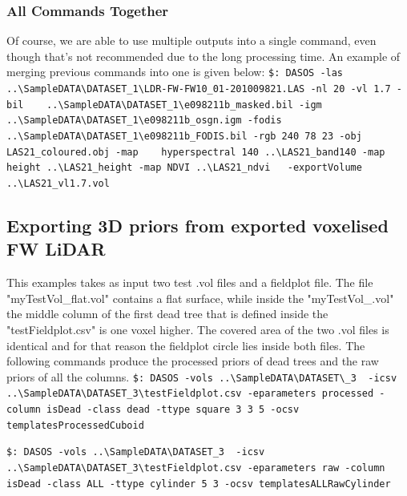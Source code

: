 \documentclass{article}
\begin{document}
	    \subsubsection{All Commands Together}
	    \par Of course, we are able to use multiple outputs into a single command, even though that's not recommended due to the long processing time. An example of merging previous commands into one is given below:\newline
	    \verb|$: DASOS -las ..\SampleDATA\DATASET_1\LDR-FW-FW10_01-201009821.LAS -nl 20 -vl 1.7|\newline \verb| -bil    ..\SampleDATA\DATASET_1\e098211b_masked.bil -igm  |\newline \verb|   ..\SampleDATA\DATASET_1\e098211b_osgn.igm -fodis |\newline \verb|   ..\SampleDATA\DATASET_1\e098211b_FODIS.bil -rgb 240 78 23 -obj|\newline \verb| LAS21_coloured.obj -map |\newline \verb|   hyperspectral 140 ..\LAS21_band140 -map  height ..\LAS21_height -map NDVI |\newline \verb|..\LAS21_ndvi   -exportVolume ..\LAS21_vl1.7.vol|\newline
	    
	    \subsection{Exporting 3D priors from exported voxelised FW LiDAR}
	    \par This examples takes as input two test .vol files and a fieldplot file. The file "myTestVol\_flat.vol" contains a flat surface, while inside the "myTestVol\_.vol" the middle column of the first dead tree that is defined inside the "testFieldplot.csv" is one voxel higher. The covered area of the two .vol files is identical and for that reason the fieldplot circle lies inside both files. The following commands produce the processed priors of dead trees and the raw priors of all the columns.
	    \newpage
	   \verb|$: DASOS -vols ..\SampleDATA\DATASET\_3  -icsv |\newline \verb|..\SampleDATA\DATASET_3\testFieldplot.csv -eparameters processed -column isDead |\newline \verb|-class dead -ttype square 3 3 5 -ocsv templatesProcessedCuboid |
	   
	   \verb|$: DASOS -vols ..\SampleDATA\DATASET_3  -icsv |\newline \verb|..\SampleDATA\DATASET_3\testFieldplot.csv -eparameters raw -column isDead -class|\newline \verb| ALL -ttype cylinder 5 3 -ocsv templatesALLRawCylinder|
	   
\end{document}
